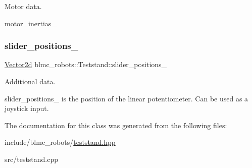 Motor data. 

motor\+\_\+inertias\+\_\+ \mbox{\label{classblmc__robots_1_1Teststand_ad0ce099eef5b57553d36927e3f7f1203}} 
\subsubsection{\texorpdfstring{slider\+\_\+positions\+\_\+}{slider\_positions\_}}
{\footnotesize\ttfamily \hyperlink{common__header_8hpp_acb6916bc8c9fe9d98c484fd4cc201447}{Vector2d} blmc\+\_\+robots\+::\+Teststand\+::slider\+\_\+positions\+\_\+\hspace{0.3cm}{\ttfamily [private]}}



Additional data. 

slider\+\_\+positions\+\_\+ is the position of the linear potentiometer. Can be used as a joystick input. 

The documentation for this class was generated from the following files\+:\begin{DoxyCompactItemize}
\item 
include/blmc\+\_\+robots/\hyperlink{teststand_8hpp}{teststand.\+hpp}\item 
src/teststand.\+cpp\end{DoxyCompactItemize}
